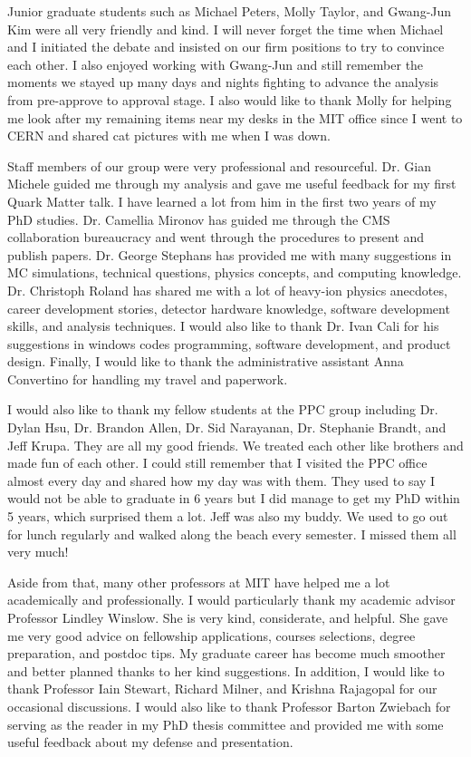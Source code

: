 Junior graduate students such as Michael Peters, Molly Taylor, and Gwang-Jun Kim were all very friendly and kind. I will never forget the time when Michael and I initiated the debate and insisted on our firm positions to try to convince each other. I also enjoyed working with Gwang-Jun and still remember the moments we stayed up many days and nights fighting to advance the analysis from pre-approve to approval stage. I also would like to thank Molly for helping me look after my remaining items near my desks in the MIT office since I went to CERN and shared cat pictures with me when I was down. 


Staff members of our group were very professional and resourceful. Dr. Gian Michele guided me through my analysis and gave me useful feedback for my first Quark Matter talk. I have learned a lot from him in the first two years of my PhD studies. Dr. Camellia Mironov has guided me through the CMS collaboration bureaucracy and went through the procedures to present and publish papers. Dr. George Stephans has provided me with many suggestions in MC simulations, technical questions, physics concepts, and computing knowledge. Dr. Christoph Roland has shared me with a lot of heavy-ion physics anecdotes, career development stories, detector hardware knowledge, software development skills, and analysis techniques. I would also like to thank Dr. Ivan Cali for his suggestions in windows codes programming, software development, and product design. Finally, I would like to thank the administrative assistant Anna Convertino for handling my travel and paperwork.  


I would also like to thank my fellow students at the PPC group including Dr. Dylan Hsu, Dr. Brandon Allen, Dr. Sid Narayanan, Dr. Stephanie Brandt, and Jeff Krupa. They are all my good friends. We treated each other like brothers and made fun of each other. I could still remember that I visited the PPC office almost every day and shared how my day was with them. They used to say I would not be able to graduate in 6 years but I did manage to get my PhD within 5 years, which surprised them a lot. Jeff was also my buddy. We used to go out for lunch regularly and walked along the beach every semester. I missed them all very much!

Aside from that, many other professors at MIT have helped me a lot academically and professionally. I would particularly thank my academic advisor Professor Lindley Winslow. She is very kind, considerate, and helpful. She gave me very good advice on fellowship applications, courses selections, degree preparation, and postdoc tips. My graduate career has become much smoother and better planned thanks to her kind suggestions. In addition, I would like to thank Professor Iain Stewart, Richard Milner, and Krishna Rajagopal for our occasional discussions. I would also like to thank Professor Barton Zwiebach for serving as the reader in my PhD thesis committee and provided me with some useful feedback about my defense and presentation.

